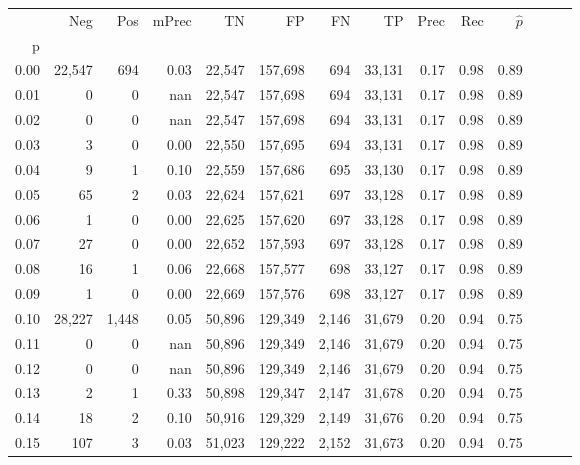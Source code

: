 \begin{tabular}{rrrrrrrrrrrrrr}
\toprule
{} &     Neg &    Pos & mPrec &       TN &       FP &      FN &      TP &  Prec &   Rec & $\hat{p}$ \\
p    &         &        &       &          &          &         &         &       &       &           \\
\midrule
0.00 &  22,547 &    694 &  0.03 &   22,547 &  157,698 &     694 &  33,131 &  0.17 &  0.98 &      0.89 \\
0.01 &       0 &      0 &   nan &   22,547 &  157,698 &     694 &  33,131 &  0.17 &  0.98 &      0.89 \\
0.02 &       0 &      0 &   nan &   22,547 &  157,698 &     694 &  33,131 &  0.17 &  0.98 &      0.89 \\
0.03 &       3 &      0 &  0.00 &   22,550 &  157,695 &     694 &  33,131 &  0.17 &  0.98 &      0.89 \\
0.04 &       9 &      1 &  0.10 &   22,559 &  157,686 &     695 &  33,130 &  0.17 &  0.98 &      0.89 \\
0.05 &      65 &      2 &  0.03 &   22,624 &  157,621 &     697 &  33,128 &  0.17 &  0.98 &      0.89 \\
0.06 &       1 &      0 &  0.00 &   22,625 &  157,620 &     697 &  33,128 &  0.17 &  0.98 &      0.89 \\
0.07 &      27 &      0 &  0.00 &   22,652 &  157,593 &     697 &  33,128 &  0.17 &  0.98 &      0.89 \\
0.08 &      16 &      1 &  0.06 &   22,668 &  157,577 &     698 &  33,127 &  0.17 &  0.98 &      0.89 \\
0.09 &       1 &      0 &  0.00 &   22,669 &  157,576 &     698 &  33,127 &  0.17 &  0.98 &      0.89 \\
0.10 &  28,227 &  1,448 &  0.05 &   50,896 &  129,349 &   2,146 &  31,679 &  0.20 &  0.94 &      0.75 \\
0.11 &       0 &      0 &   nan &   50,896 &  129,349 &   2,146 &  31,679 &  0.20 &  0.94 &      0.75 \\
0.12 &       0 &      0 &   nan &   50,896 &  129,349 &   2,146 &  31,679 &  0.20 &  0.94 &      0.75 \\
0.13 &       2 &      1 &  0.33 &   50,898 &  129,347 &   2,147 &  31,678 &  0.20 &  0.94 &      0.75 \\
0.14 &      18 &      2 &  0.10 &   50,916 &  129,329 &   2,149 &  31,676 &  0.20 &  0.94 &      0.75 \\
0.15 &     107 &      3 &  0.03 &   51,023 &  129,222 &   2,152 &  31,673 &  0.20 &  0.94 &      0.75 \\

\end{tabular}
